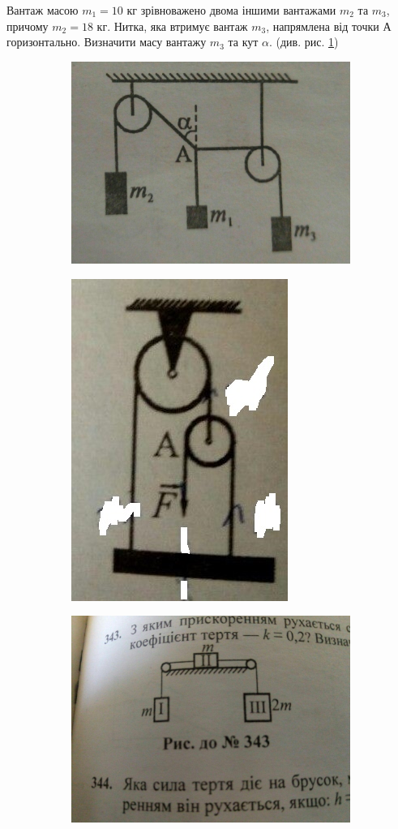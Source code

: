 \justifying 

\begin{problem}{1}
	Вантаж масою $m_1 = 10$ кг зрівноважено двома іншими вантажами $m_2$ та $m_3$, причому $m_2 = 18$ кг. Нитка, яка втримує вантаж $m_3$, напрямлена від точки А горизонтально. Визначити масу вантажу $m_3$ та кут $\alpha$. (див. рис. \ref{fig:gon353})
	\begin{figure}[h!]
		\centering
		\begin{subfigure}{.4\textwidth}
			\centering
			\includegraphics[width=0.5\linewidth]{class7/gon_353}
			\caption{}
			\label{fig:gon353}
		\end{subfigure}
		\begin{subfigure}{.4\textwidth}
			\centering
			\includegraphics[width=0.5\linewidth]{class7/gon_269}
			\caption{}
			\label{fig:gon269}
		\end{subfigure}
		\begin{subfigure}{.4\textwidth}
			\centering
			\includegraphics[width=0.5\linewidth]{class7/gon_343}

\end{subfigure}
\end{figure}
\end{problem}

